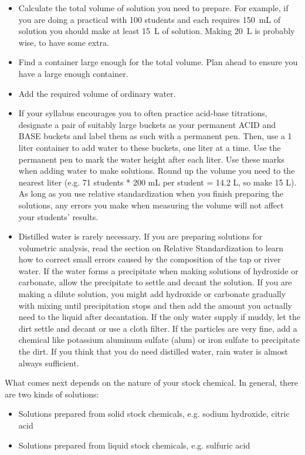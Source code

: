 \begin{itemize}

\item{Calculate the total volume of solution you need to prepare. For example, if you are doing a practical with 100 students and each requires 150~mL of solution you should make at least 15~L of solution. Making 20~L is probably wise, to have some extra.}

\item{Find a container large enough for the total volume. Plan ahead to ensure you have a large enough container.}

\item{Add the required volume of ordinary water.}

\item{If your syllabus encourages you to often practice acid-base titrations, designate a pair of suitably large buckets as your permanent ACID and BASE buckets and label them as such with a permanent pen. Then, use a 1 liter container to add water to these buckets, one liter at a time. Use the permanent pen to mark the water height after each liter. Use these marks when adding water to make solutions. Round up the volume you need to the nearest liter (e.g. 71 students * 200 mL per student = 14.2 L, so make 15 L). As long as you use relative standardization when you finish preparing the solutions, any errors you make when measuring the volume will not affect your students' results.}

\item{Distilled water is rarely necessary. If you are preparing solutions for volumetric analysis, read the section on Relative Standardization to learn how to correct small errors caused by the composition of the tap or river water. If the water forms a precipitate when making solutions of hydroxide or carbonate, allow the precipitate to settle and decant the solution. If you are making a dilute solution, you might add hydroxide or carbonate gradually with mixing until precipitation stops and then add the amount you actually need to the liquid after decantation. If the only water supply if muddy, let the dirt settle and decant or use a cloth filter. If the particles are very fine, add a chemical like potassium aluminum sulfate (alum) or iron sulfate to precipitate the dirt. If you think that you do need distilled water, rain water is almost always sufficient.}
\end{itemize}

What comes next depends on the nature of your stock chemical. In general, there are two kinds of solutions:
\begin{itemize}
\item{Solutions prepared from solid stock chemicals, e.g. sodium hydroxide, citric acid}
\item{Solutions prepared from liquid stock chemicals, e.g. sulfuric acid}
\end{itemize}

